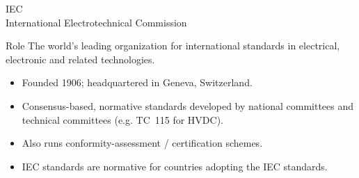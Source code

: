 
\begin{frame}{IEC\\International Electrotechnical Commission}
  \begin{block}{Role}
    The world's leading organization for international standards in electrical, electronic and related technologies.
  \end{block}
  \vspace{0.3em}
  \begin{itemize}
    \setlength{\itemsep}{0.4em}
    \item Founded 1906; headquartered in Geneva, Switzerland.
    \item Consensus-based, normative standards developed by national committees and technical committees (e.g. TC~115 for HVDC).
    \item Also runs conformity-assessment / certification schemes.
    \item IEC standards are normative for countries adopting the IEC standards.
  \end{itemize}
\end{frame}


